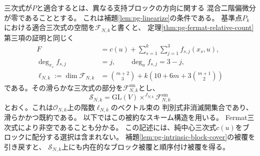 三次式が$P$と適合するとは、異なる支持ブロックの方向に関する
混合二階偏微分が零であることとする。
これは補題\ref{lem:pg-linearize}の条件である。
基準点$P_k$における適合三次式の空間を$\mathcal F_{N,k}$と書くと、
定理\ref{thm:pg-fermat-relative-count}第三項の証明と同じく
\begin{equation}
 \begin{aligned}
 F&=c(u)+\sum_{s=1}^k\sum_{j=1}^3 f_{s,j}(x_s,u),\\
 \deg_{x_s}f_{s,j}&=j,\qquad\deg_u f_{s,j}=3-j,\\
 \ell_{N,k}:=\dim\mathcal F_{N,k}
   &=\binom{m+2}{3}
     +k\left(10+6m+3\binom{m+1}{2}\right)
 \end{aligned}
 \label{eq:pg-intrinsic-multiblock-cubic-fiber}
\end{equation}
である。その滑らかな三次式の部分を$\mathcal F_{N,k}^{\mathrm{sm}}$とし、
\begin{equation}
 \mathcal S_{N,k}
  =\mathrm{GL}(V)\times^{J_{N,k}}\mathcal F_{N,k}^{\mathrm{sm}}
 \label{eq:pg-intrinsic-multiblock-incidence}
\end{equation}
とおく。これは$\mathcal O_{N,k}$上の階数$\ell_{N,k}$のベクトル束の
判別式非消滅開集合であり、滑らかかつ既約である。
以下ではこの被約なスキーム構造を用いる。
Fermat三次式により非空であることも分かる。
この記述には、純中心三次式$c(u)$をブロックに配分する選択は含まれない。
補題\ref{lem:pg-intrinsic-block-cover}の被覆を引き戻すと、
$\mathcal S_{N,k}$上にも内在的なブロック被覆と順序付け被覆を得る。

